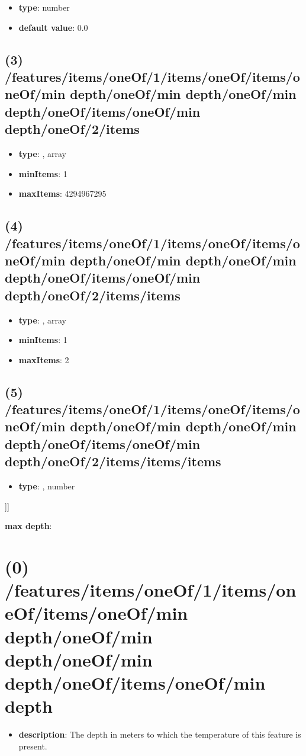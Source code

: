 \begin{itemize}[leftmargin=4em]\item {\bf type}: number\item {\bf default value}: 0.0
\end{itemize}\subsection{(3) /features/items/oneOf/1/items/oneOf/items/oneOf/min depth/oneOf/min depth/oneOf/min depth/oneOf/items/oneOf/min depth/oneOf/2/items}
\begin{itemize}[leftmargin=3em]\item {\bf type}: , array\item {\bf minItems}: 1
\item {\bf maxItems}: 4294967295
\end{itemize}\subsection{(4) /features/items/oneOf/1/items/oneOf/items/oneOf/min depth/oneOf/min depth/oneOf/min depth/oneOf/items/oneOf/min depth/oneOf/2/items/items}
\begin{itemize}[leftmargin=4em]\item {\bf type}: , array\item {\bf minItems}: 1
\item {\bf maxItems}: 2
\end{itemize}\subsection{(5) /features/items/oneOf/1/items/oneOf/items/oneOf/min depth/oneOf/min depth/oneOf/min depth/oneOf/items/oneOf/min depth/oneOf/2/items/items/items}
\begin{itemize}[leftmargin=5em]\item {\bf type}: , number\end{itemize}]]\item {\bf max depth}: \section{(0) /features/items/oneOf/1/items/oneOf/items/oneOf/min depth/oneOf/min depth/oneOf/min depth/oneOf/items/oneOf/min depth}
\begin{itemize}[leftmargin=0em]\item {\bf description}: The depth in meters to which the temperature of this feature is present.
\end{itemize}
